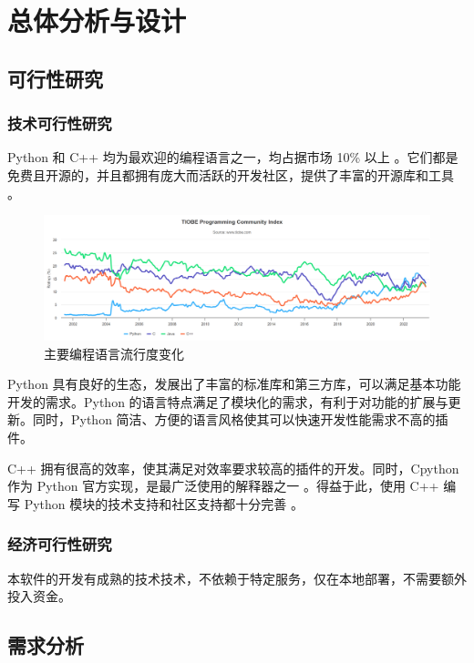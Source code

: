 \chapter{总体分析与设计}


\section{可行性研究}

\subsection{技术可行性研究}

Python 和 C++ 均为最欢迎的编程语言之一，均占据市场 10\% 以上 \cite{tiobe}。它们都是免费且开源的，并且都拥有庞大而活跃的开发社区，提供了丰富的开源库和工具 \cite{pep206}。

\begin{figure}[h]
    \centering
    \includegraphics[width=\textwidth]{figures/tiobe.png}
    \caption{主要编程语言流行度变化}
    \label{fig:tiobe}
\end{figure}

Python 具有良好的生态，发展出了丰富的标准库和第三方库，可以满足基本功能开发的需求。Python 的语言特点满足了模块化的需求，有利于对功能的扩展与更新。同时，Python 简洁、方便的语言风格使其可以快速开发性能需求不高的插件。

C++ 拥有很高的效率，使其满足对效率要求较高的插件的开发。同时，Cpython 作为 Python 官方实现，是最广泛使用的解释器之一 \cite{c_py}。得益于此，使用 C++ 编写 Python 模块的技术支持和社区支持都十分完善 \cite{cmodule_py}。

\subsection{经济可行性研究}

本软件的开发有成熟的技术技术，不依赖于特定服务，仅在本地部署，不需要额外投入资金。

\section{需求分析}

